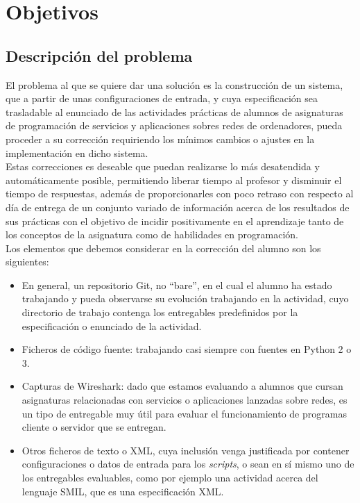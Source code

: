\cleardoublepage
\chapter{Objetivos}
\label{chap:objetivos}


\section{Descripción del problema}
\label{sec:des_problema}


El problema al que se quiere dar una solución es la construcción de un sistema, que a partir de unas configuraciones de entrada, y cuya especificación sea trasladable al enunciado de las actividades prácticas de alumnos de asignaturas de programación de servicios y aplicaciones sobres redes de ordenadores, pueda proceder a su corrección requiriendo los mínimos cambios o ajustes en la implementación en dicho sistema.\\


Estas correcciones es deseable que puedan realizarse lo más desatendida y automáticamente posible, permitiendo liberar tiempo al profesor y disminuir el tiempo de respuestas, además de proporcionarles con poco retraso con respecto al día de entrega de un conjunto variado de información acerca de los resultados de sus prácticas con el objetivo de incidir positivamente en el aprendizaje tanto de los conceptos de la asignatura como de habilidades en programación.\\


Los elementos que debemos considerar en la corrección del alumno son los siguientes:\\

\begin{itemize}
\item En general, un repositorio Git, no ``bare'', en el cual el alumno ha estado trabajando y pueda observarse su evolución trabajando en la actividad, cuyo directorio de trabajo contenga los entregables predefinidos por la especificación o enunciado de la actividad.

\item Ficheros de código fuente: trabajando casi siempre con fuentes en Python 2 o 3.

\item Capturas de Wireshark: dado que estamos evaluando a alumnos que cursan asignaturas relacionadas con servicios o aplicaciones lanzadas sobre redes, es un tipo de entregable muy útil para evaluar el funcionamiento de programas cliente o servidor que se entregan.

\item Otros ficheros de texto o XML, cuya inclusión venga justificada por contener configuraciones o datos de entrada para los \textit{scripts}, o sean en sí mismo uno de los entregables evaluables, como por ejemplo una actividad acerca del lenguaje SMIL, que es una especificación XML.
\end{itemize}


